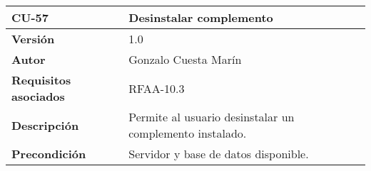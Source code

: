 \begin{longtable}[]{@{}ll@{}}
\toprule
\begin{minipage}[b]{0.22\columnwidth}\raggedright
\textbf{CU-57}\strut
\end{minipage} & \begin{minipage}[b]{0.72\columnwidth}\raggedright
\textbf{Desinstalar complemento}\strut
\end{minipage}\tabularnewline
\midrule
\endhead
\begin{minipage}[t]{0.22\columnwidth}\raggedright
\textbf{Versión}\strut
\end{minipage} & \begin{minipage}[t]{0.72\columnwidth}\raggedright
1.0\strut
\end{minipage}\tabularnewline
\begin{minipage}[t]{0.22\columnwidth}\raggedright
\textbf{Autor}\strut
\end{minipage} & \begin{minipage}[t]{0.72\columnwidth}\raggedright
Gonzalo Cuesta Marín\strut
\end{minipage}\tabularnewline
\begin{minipage}[t]{0.22\columnwidth}\raggedright
\textbf{Requisitos asociados}\strut
\end{minipage} & \begin{minipage}[t]{0.72\columnwidth}\raggedright
RFAA-10.3\strut
\end{minipage}\tabularnewline
\begin{minipage}[t]{0.22\columnwidth}\raggedright
\textbf{Descripción}\strut
\end{minipage} & \begin{minipage}[t]{0.72\columnwidth}\raggedright
Permite al usuario desinstalar un complemento instalado.\strut
\end{minipage}\tabularnewline
\begin{minipage}[t]{0.22\columnwidth}\raggedright
\textbf{Precondición}\strut
\end{minipage} & \begin{minipage}[t]{0.72\columnwidth}\raggedright
Servidor y base de datos disponible.


\end{minipage}
\end{longtable}
